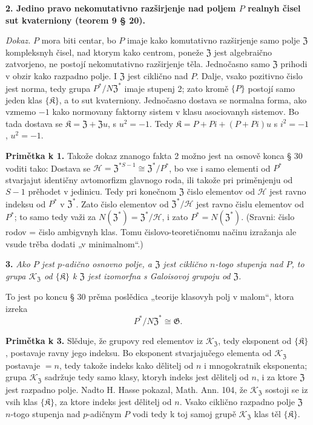 \documentclass[11pt]{article}
\begin{document}
\noindent\textbf{2. Jedino pravo nekomutativno razširjenje nad poljem \(P\) realnyh čisel sut kvaterniony (teorem 9 § 20).}

\noindent\emph{Dokaz.} \(P\) mora biti centar, bo \(P\) imaje kako komutativno razširjenje samo polje \(\mathfrak Z\) kompleksnyh čisel, nad ktorym kako centrom, poneže \(\mathfrak Z\) jest algebraično zatvorjeno, ne postojí nekomutativno razširjenje těla. Jednočasno samo \(\mathfrak Z\) prihodi v obzir kako razpadno polje. I \(\mathfrak Z\) jest ciklično nad \(P\). Dalje, vsako pozitivno čislo jest norma, tedy grupa \(P^*/N\mathfrak Z^*\) imaje stupenj 2; zato kromě \(\{P\}\) postojí samo jeden klas \(\{\mathfrak K\}\), a to sut kvaterniony. Jednočasno dostava se normalna forma, ako vzmemo \(-1\) kako normovany faktorny sistem v klasu asociovanyh sistemov. Bo tada dostava se \(\mathfrak K=\mathfrak Z+\mathfrak Zu\), s \(u^2=-1\). Tedy \(\mathfrak K=P+Pi+(P+Pi)u\) s \(i^2=-1\), \(u^2=-1\).

\noindent\textbf{Primětka k 1.} Takože dokaz znanogo fakta 2 možno jest na osnově konca § 30 voditi tako: Dostava se \(\mathscr H=\mathfrak Z^{*S-1}\cong\mathfrak Z^*/P^*\), bo vse i samo elementi od \(P^*\) stvarjajut identičny avtomorfizm glavnogo roda, ili takože pri priměnjenju od \(S-1\) prěhodet v jedinicu. Tedy pri konečnom \(\mathfrak Z\) čislo elementov od \(\mathscr H\) jest ravno indeksu od \(P^*\) v \(\mathfrak Z^*\). Zato čislo elementov od \(\mathfrak Z^*/\mathscr H\) jest ravno čislu elementov od \(P^*\); to samo tedy važi za \(N(\mathfrak Z^*)=\mathfrak Z^*/\mathscr H\), i zato \(P^*=N(\mathfrak Z^*)\). (Sravni: čislo rodov = čislo ambigvnyh klas. Tomu čislovo-teoretičnomu načinu izražanja ale vsude trěba dodati „v minimalnom“.)

\noindent\textbf{3.} \emph{Ako \(P\) jest \(p\)-adično osnovno polje, a \(\mathfrak Z\) jest ciklično \(n\)-togo stupenja nad \(P\), to grupa \(\mathscr K_{\mathfrak Z}\) od \(\{\mathfrak K\}\) k \(\mathfrak Z\) jest izomorfna s Galoisovoj grupoju od \(\mathfrak Z\).}

To jest po koncu § 30 prěma poslědica „teorije klasovyh polj v malom“, ktora izreka
\[
P^*/N\mathfrak Z^*\cong\mathfrak G.
\]

\noindent\textbf{Primětka k 3.} Slěduje, že grupovy red elementov iz \(\mathscr K_{\mathfrak Z}\), tedy eksponent od \(\{\mathfrak K\}\), postavaje ravny jego indeksu. Bo eksponent stvarjajučego elementa od \(\mathscr K_{\mathfrak Z}\) postavaje \(=n\), tedy takože indeks kako dělitelj od \(n\) i mnogokratnik eksponenta; grupa \(\mathscr K_{\mathfrak Z}\) sadržuje tedy samo klasy, ktoryh indeks jest dělitelj od \(n\), i za ktore \(\mathfrak Z\) jest razpadno polje. Nadto H. Hasse pokazal, Math. Ann. 104, že \(\mathscr K_{\mathfrak Z}\) sostoji se iz vsih klas \(\{\mathfrak K\}\), za ktore indeks jest dělitelj od \(n\). Vsako ciklično razpadno polje \(\mathfrak Z\) \(n\)-togo stupenja nad \(p\)-adičnym \(P\) vodi tedy k toj samoj grupě \(\mathscr K_{\mathfrak Z}\) klas těl \(\{\mathfrak K\}\).
\end{document}
